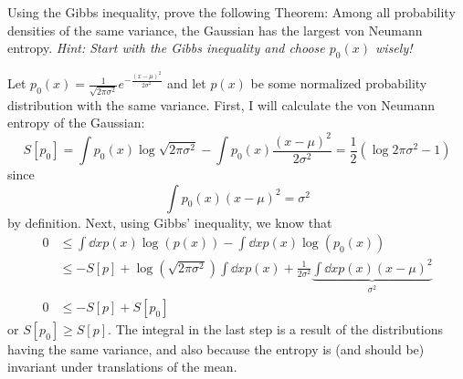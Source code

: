 \documentclass[a4paper,twoside]{article}
\begin{document}
\begin{itemize}
\begin{equation}
        \end{equation}
        Using the Gibbs inequality, prove the following Theorem: Among all probability densities of the same variance, the Gaussian has the largest von Neumann entropy. \textit{Hint: Start with the Gibbs inequality and choose $ p_0(x) $ wisely!}
        \begin{problem}
            Let $ p_0(x) = \frac{1}{\sqrt{2 \pi \sigma^2}} e^{- \frac{(x - \mu)^2}{2 \sigma^2}} $ and let $ p(x) $ be some normalized probability distribution with the same variance. First, I will calculate the von Neumann entropy of the Gaussian:
            \begin{equation}
                S[p_0] = \int p_0(x) \log{\sqrt{2 \pi \sigma^2}} - \int p_0(x) \frac{(x - \mu)^2}{2 \sigma^2} = \frac{1}{2} \left( \log{2 \pi \sigma^2} - 1 \right)
            \end{equation}
            since
            \begin{equation}
                \int p_0(x) (x - \mu)^2 = \sigma^2
            \end{equation}
            by definition. Next, using Gibbs' inequality, we know that
            \begin{align}
                0 &\leq \int \dd{x} p(x) \log(p(x)) - \int \dd{x} p(x) \log(p_0(x)) \\
                &\leq -S[p] + \log(\sqrt{2 \pi \sigma^2})\int \dd{x} p(x) + \frac{1}{2 \sigma^2} \underbrace{\int \dd{x} p(x) (x - \mu)^2}_{\sigma^2} \\
                0 &\leq -S[p] + S[p_0]
            \end{align}
            or $ S[p_0] \geq S[p] $. The integral in the last step is a result of the distributions having the same variance, and also because the entropy is (and should be) invariant under translations of the mean.
        \end{problem}
\end{itemize}
\end{document}
